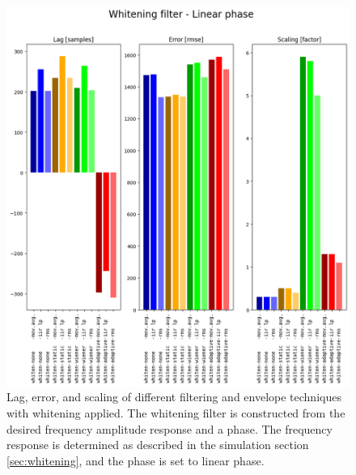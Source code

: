 \begin{figure}[h!t]
	\begin{center}
		\includegraphics[width=1.0\columnwidth]{images/result_whitening_linearphase.png}
	\end{center}
	\caption{Lag, error, and scaling of different filtering and envelope techniques with whitening applied. The whitening filter is constructed from the desired frequency amplitude response and a phase. The frequency response is determined as described in the simulation section \ref{sec:whitening}, and the phase is set to linear phase. }
	\label{fig:result_whitening_linearphase}
\end{figure}

